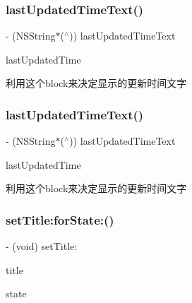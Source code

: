 \subsubsection{\texorpdfstring{last\+Updated\+Time\+Text()}{lastUpdatedTimeText()}\hspace{0.1cm}{\footnotesize\ttfamily [1/2]}}
{\footnotesize\ttfamily -\/ (N\+S\+String$\ast$($^\wedge$)) last\+Updated\+Time\+Text \begin{DoxyParamCaption}\item[{(N\+S\+Date $\ast$)}]{last\+Updated\+Time }\end{DoxyParamCaption}}

利用这个block来决定显示的更新时间文字 \mbox{\label{interface_m_j_refresh_state_header_aac71baeca3ab02f438f09eaa7bc3f705}} 
\subsubsection{\texorpdfstring{last\+Updated\+Time\+Text()}{lastUpdatedTimeText()}\hspace{0.1cm}{\footnotesize\ttfamily [2/2]}}
{\footnotesize\ttfamily -\/ (N\+S\+String$\ast$($^\wedge$)) last\+Updated\+Time\+Text \begin{DoxyParamCaption}\item[{(N\+S\+Date $\ast$)}]{last\+Updated\+Time }\end{DoxyParamCaption}}

利用这个block来决定显示的更新时间文字 \mbox{\label{interface_m_j_refresh_state_header_a0c7a98e2c4fd7d8971525d17a8f7e519}} 
\subsubsection{\texorpdfstring{set\+Title\+:for\+State\+:()}{setTitle:forState:()}\hspace{0.1cm}{\footnotesize\ttfamily [1/3]}}
{\footnotesize\ttfamily -\/ (void) set\+Title\+: \begin{DoxyParamCaption}\item[{(N\+S\+String $\ast$)}]{title }\item[{forState:(M\+J\+Refresh\+State)}]{state }\end{DoxyParamCaption}}

